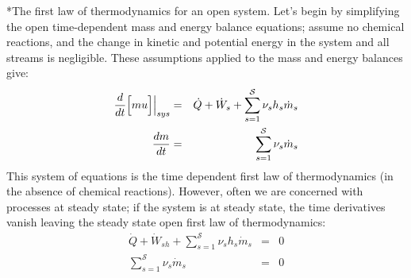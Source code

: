 \documentclass[11pt]{article}
\makeatletter
\theoremstyle{definition}
\renewcommand\subsection{\@startsection
	{subsection}{2}{0mm}
	{-0.05in}
	{0.5\baselineskip}
	{\normalfont\normalsize\bfseries}}
\makeatother
\begin{document}
\subsection*{The first law of thermodynamics for an open system.}
Let's begin by simplifying the open time-dependent mass and energy balance equations; assume no chemical reactions, and the change in kinetic and potential energy in the system and all streams is negligible.
These assumptions applied to the mass and energy balances give:
\begin{eqnarray}
	\frac{d}{dt}\Bigl[mu\Bigl]\Bigr|_{sys} &=& \dot{Q}+\dot{W}_{s} + \sum_{s=1}^{\mathcal{S}}\nu_{s}h_{s}\dot{m}_{s}\\
	\frac{dm}{dt} &=& \sum_{s=1}^{\mathcal{S}}\nu_{s}\dot{m}_{s}
\end{eqnarray}
This system of equations is the time dependent first law of thermodynamics (in the absence of chemical reactions).
However, often we are concerned with processes at steady state;
if the system is at steady state, the time derivatives vanish leaving the steady state open first law of thermodynamics:
\begin{eqnarray}
	\dot{Q}+\dot{W}_{sh} + \sum_{s=1}^{\mathcal{S}}\nu_{s}h_{s}\dot{m}_{s} & = & 0 \\
	\sum_{s=1}^{\mathcal{S}}\nu_{s}\dot{m}_{s} & = & 0
\end{eqnarray}

\clearpage
\end{document}
